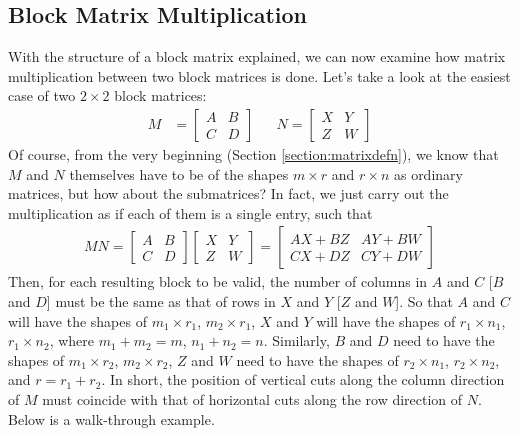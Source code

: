 \subsection{Block Matrix Multiplication}
\label{subsection:blockmul}

With the structure of a block matrix explained, we can now examine how matrix multiplication between two block matrices is done. Let's take a look at the easiest case of two $2 \times 2$ block matrices:
\begin{align*}
M &=
\begin{bmatrix}
A & B \\
C & D
\end{bmatrix} 
& &
N =
\begin{bmatrix}
X & Y \\
Z & W
\end{bmatrix} 
\end{align*}
Of course, from the very beginning (Section \ref{section:matrixdefn}), we know that $M$ and $N$ themselves have to be of the shapes $m \times r$ and $r \times n$ as ordinary matrices, but how about the submatrices? In fact, we just carry out the multiplication as if each of them is a single entry, such that
\begin{align}
MN = 
\begin{bmatrix}
A & B \\
C & D
\end{bmatrix} 
\begin{bmatrix}
X & Y \\
Z & W
\end{bmatrix} 
=
\begin{bmatrix}
AX + BZ & AY + BW \\
CX + DZ & CY + DW
\end{bmatrix}
\end{align}
Then, for each resulting block to be valid, the number of columns in $A$ and $C$ [$B$ and $D$] must be the same as that of rows in $X$ and $Y$ [$Z$ and $W$]. So that $A$ and $C$ will have the shapes of $m_1 \times r_1$, $m_2 \times r_1$, $X$ and $Y$ will have the shapes of $r_1 \times n_1$, $r_1 \times n_2$, where $m_1 + m_2 = m$, $n_1 + n_2 = n$. Similarly, $B$ and $D$ need to have the shapes of $m_1 \times r_2$, $m_2 \times r_2$, $Z$ and $W$ need to have the shapes of $r_2 \times n_1$, $r_2 \times n_2$, and $r = r_1 + r_2$. In short, the position of vertical cuts along the column direction of $M$ must coincide with that of horizontal cuts along the row direction of $N$. Below is a walk-through example.

